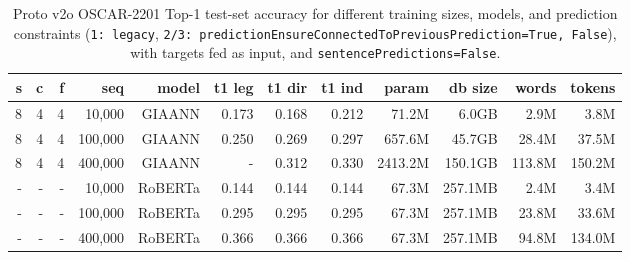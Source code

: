 \begin{table}[H]
\centering
\caption{Proto v2o OSCAR-2201 Top-1 test-set accuracy for different training sizes, models, and prediction constraints (\texttt{1: legacy}, \texttt{2/3: predictionEnsureConnectedToPreviousPrediction=True, False}), with targets fed as input, and \texttt{sentencePredictions=False}.}
\label{tab:protov2o-oscar-test-top1-accuracy-models-inferenceLeakyIntegrateAndFire-predictionConstraints}
\begin{tabular}{rrrrrrrrrrrr}
\toprule
\textbf{s} & \textbf{c} & \textbf{f} & \textbf{seq} & \textbf{model} & \textbf{t1 leg} & \textbf{t1 dir} & \textbf{t1 ind} & \textbf{param} & \textbf{db size} & \textbf{words} & \textbf{tokens} \\
\midrule
8 & 4 & 4 & 10,000  & GIAANN & 0.173 & 0.168 & 0.212 & 71.2M & 6.0GB & 2.9M & 3.8M \\
8 & 4 & 4 & 100,000 & GIAANN & 0.250 & 0.269 & 0.297 & 657.6M & 45.7GB & 28.4M & 37.5M \\
8 & 4 & 4 & 400,000 & GIAANN & - & 0.312 & 0.330 &  2413.2M & 150.1GB & 113.8M & 150.2M \\
- & - & - & 10,000  & RoBERTa & 0.144 & 0.144 & 0.144 & 67.3M & 257.1MB & 2.4M & 3.4M \\
- & - & - & 100,000 & RoBERTa & 0.295 & 0.295 & 0.295 & 67.3M & 257.1MB & 23.8M & 33.6M \\
- & - & - & 400,000 & RoBERTa & 0.366 & 0.366 & 0.366 & 67.3M & 257.1MB & 94.8M & 134.0M \\
\bottomrule
\end{tabular}
\end{table}

